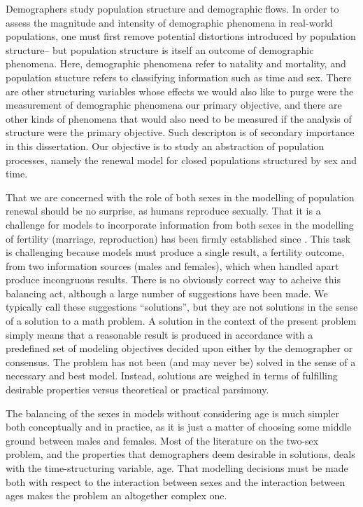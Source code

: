 Demographers study population structure and demographic flows. In order
to assess the magnitude and intensity of demographic phenomena in real-world
populations, one must first remove potential distortions introduced by
population structure-- but population structure is itself an outcome
of demographic phenomena. Here, demographic phenomena refer to natality and
mortality, and population stucture refers to classifying information such as
time and sex. There are other structuring variables whose effects we would also
like to purge were the measurement of demographic phenomena 
our primary objective, and there are other kinds of phenomena that would also
need to be measured if the analysis of structure were the primary
objective. Such descripton is of secondary importance in this dissertation. Our
objective is to study an abstraction of population processes, namely the 
renewal model for closed populations structured by sex and time.

That we are concerned with the role of both sexes in the modelling of population
renewal should be no surprise, as humans reproduce sexually. That it is a
challenge for models to incorporate information from both sexes in the modelling
of fertility (marriage, reproduction) has been firmly established since
\citet{karmel1947relations}. This task is challenging because models must
produce a single result, a fertility outcome, from two information sources
(males and females), which when handled apart produce incongruous results. 
There is no obviously correct way to acheive this balancing act, although a large number of
suggestions have been made. We typically call these suggestions ``solutions'',
but they are not solutions in the sense of a solution to a math problem. A
solution in the context of the present problem simply means that a reasonable
result is produced in accordance with a predefined set of modeling objectives
decided upon either by the demographer or consensus. The problem has not been
(and may never be) solved in the sense of a necessary and best model. Instead,
solutions are weighed in terms of fulfilling desirable properties versus theoretical 
or practical parsimony.

The balancing of the sexes in models without considering age is
much simpler both conceptually and in practice, as it is just a matter of
choosing some middle ground between males and females. Most of the literature on
the two-sex problem, and the properties that demographers deem desirable in
solutions, deals with the time-structuring variable, age. That modelling
decisions must be made both with respect to the interaction between sexes and
the interaction between ages makes the problem an altogether complex one. 

